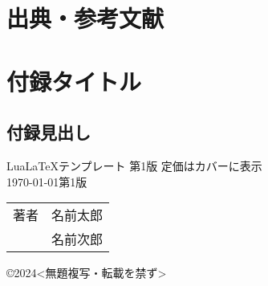 \documentclass[11pt,a4paper, titlepage]{ltjsbook}
\newcommand{\記}{\begin{center} 記 \end{center}}
\newcommand{\挨拶}{\noindent 拝啓 \ifcase\month\or 厳寒\or 春寒\or 早春
    \or 陽寒\or 新緑\or 向暑\or 猛暑\or 残暑\or 初秋\or 仲秋\or 晩秋\or 初冬
    \fi の候, ますますご清栄のこととお喜び申し上げます.}
\begin{document}
\chapter{出典・参考文献}



\appendix
\chapter{付録タイトル \label{apd:1}}
\section{付録見出し}

\newpage
\printindex  %


\begin{screen}
    {\Large Lua\LaTeX テンプレート 第1版} 定価はカバーに表示\\
    {\today 第1版}
    \begin{table}[H]
        \centering
        \renewcommand{\arraystretch}{0.8}
        \begin{tabular}{ll}
            著者 & 名前太郎 \\
               & 名前次郎 \\
        \end{tabular}
        \renewcommand{\arraystretch}{1}
    \end{table}
    ©2024<無題複写・転載を禁ず>
\end{screen}
\end{document}
